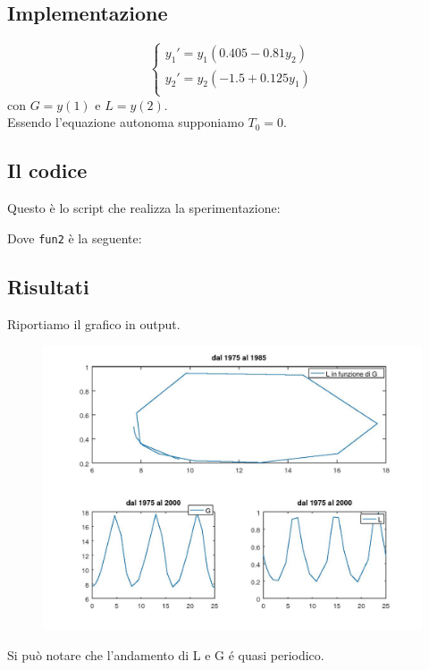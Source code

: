 \documentclass{article}
\begin{document}
	\subsection{Implementazione}
	\begin{equation}
		\begin{cases}
			y_1' = y_1 (0.405-0.81 y_2) \\
			y_2'= y_2 (-1.5+0.125 y_1)\\
		\end{cases}
	\end{equation}
	con $G=y(1)$ e $L=y(2)$.\\
	Essendo l'equazione autonoma supponiamo $T_0=0$.
	
	\subsection{Il codice}
	Questo è lo script che realizza la sperimentazione:
	
	Dove {\tt fun2} è la seguente:
	
	
	\subsection{Risultati}
	Riportiamo il grafico in output.\\
	\begin{figure}[htp!]
		\centering 
		\includegraphics[width=\textwidth]{4_3.jpeg}
	\end{figure}

	Si può notare che l'andamento di L e G é quasi periodico.
	
\end{document}
